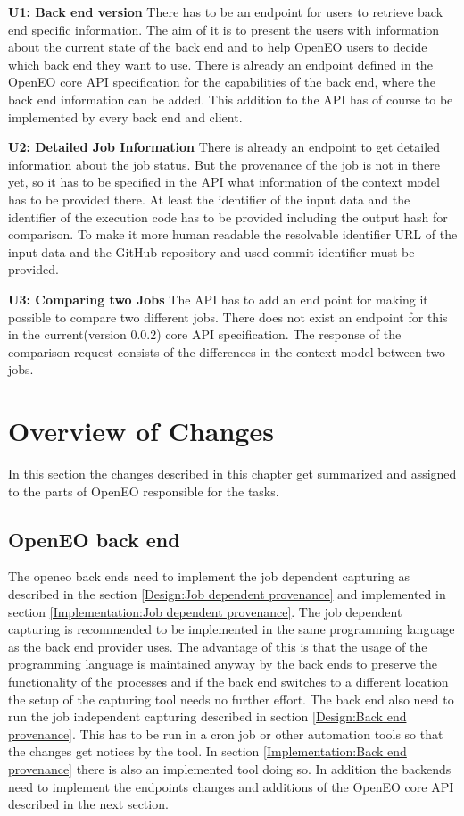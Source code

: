 \documentclass[draft,final]{vutinfth} %
\begin{document}
\textbf{U1: Back end version}
There has to be an endpoint for users to retrieve back end specific information. The aim of it is to present the users with information about the current state of the back end and to help OpenEO users to decide which back end they want to use. There is already an endpoint defined in the OpenEO core API specification for the capabilities of the back end, where the back end information can be added. This addition to the API has of course to be implemented by every back end and client.

\textbf{U2: Detailed Job Information}
There is already an endpoint to get detailed information about the job status. But the provenance of the job is not in there yet, so it has to be specified in the API what information of the context model has to be provided there. At least the identifier of the input data and the identifier of the execution code has to be provided including the output hash for comparison. To make it more human readable the resolvable identifier URL of the input data and the GitHub repository and used commit identifier must be provided.   

\textbf{U3: Comparing two Jobs}
The API has to add an end point for making it possible to compare two different jobs. There does not exist an endpoint for this in the current(version 0.0.2) core API specification. The response of the comparison request consists of the differences in the context model between two jobs. 


\section{Overview of Changes}\label{Design:Overview of Changes}
In this section the changes described in this chapter get summarized and assigned to the parts of OpenEO responsible for the tasks.
\subsection{OpenEO back end}\label{Design:OpenEO back end}
The openeo back ends need to implement the job dependent capturing as described in the section \ref{Design:Job dependent provenance} and implemented in section \ref{Implementation:Job dependent provenance}. The job dependent capturing is recommended to be implemented in the same programming language as the back end provider uses. The advantage of this is that the usage of the programming language is maintained anyway by the back ends to preserve the functionality of the processes and if the back end switches to a different location the setup of the capturing tool needs no further effort. 
The back end also need to run the job independent capturing described in section \ref{Design:Back end provenance}. This has to be run in a cron job or other automation tools so that the changes get notices by the tool. In section \ref{Implementation:Back end provenance} there is also an implemented tool doing so. 
In addition the backends need to implement the endpoints changes and additions of the OpenEO core API described in the next section.
\end{document}
